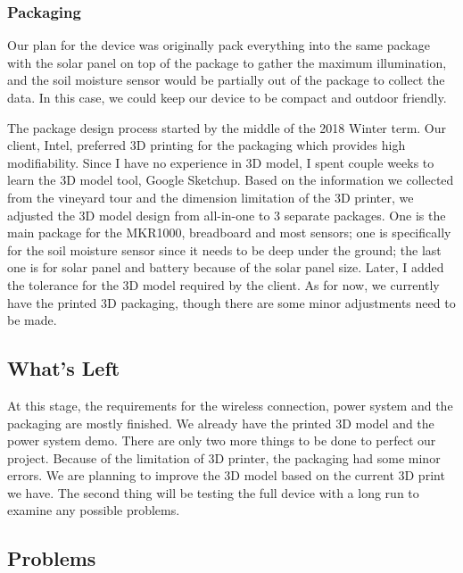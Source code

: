 \documentclass[IEEEtran,letterpaper,10pt,titlepage,fleqn,draftclsnofoot,onecolumn]{article}
\begin{document}
\subsubsection{Packaging}

Our plan for the device was originally pack everything into the same package with the solar panel on top of the package to gather the maximum illumination, and the soil moisture sensor would be partially out of the package to collect the data. In this case, we could keep our device to be compact and outdoor friendly. 

The package design process started by the middle of the 2018 Winter term. Our client, Intel, preferred 3D printing for the packaging which provides high modifiability. Since I have no experience in 3D model, I spent couple weeks to learn the 3D model tool, Google Sketchup. Based on the information we collected from the vineyard tour and the dimension limitation of the 3D printer, we adjusted the 3D model design from all-in-one to 3 separate packages. One is the main package for the MKR1000, breadboard and most sensors; one is specifically for the soil moisture sensor since it needs to be deep under the ground; the last one is for solar panel and battery because of the solar panel size. Later, I added the tolerance for the 3D model required by the client. As for now, we currently have the printed 3D packaging, though there are some minor adjustments need to be made. 

\subsection{What's Left}

At this stage, the requirements for the wireless connection, power system and the packaging are mostly finished. We already have the printed 3D model and the power system demo. There are only two more things to be done to perfect our project. Because of the limitation of 3D printer, the packaging had some minor errors. We are planning to improve the 3D model based on the current 3D print we have. The second thing will be testing the full device with a long run to examine any possible problems.

\subsection{Problems}
\end{document}
